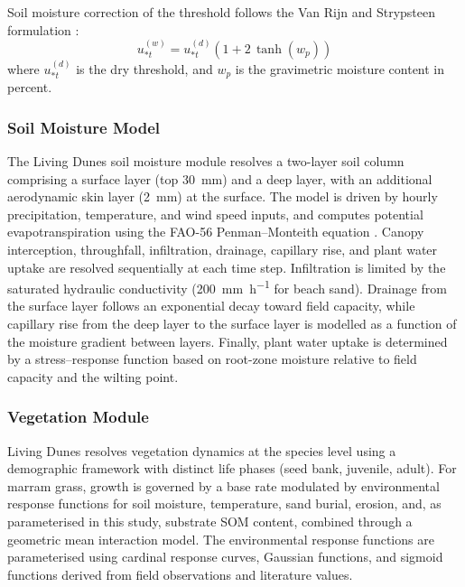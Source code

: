 \documentclass[authoryear,preprint,review,12pt]{elsarticle}
\newcommand{\ust}{u_{*t}}
\begin{document}
Soil moisture correction of the threshold follows the Van Rijn and Strypsteen formulation \citep{vanrijn2020}:
\begin{equation}
\ust^{(w)} = \ust^{(d)} \left(1 + 2\,\tanh\left(w_p\right)\right)
\label{eq:moisture_correction}
\end{equation}
where $\ust^{(d)}$ is the dry threshold, and $w_p$ is the gravimetric moisture content in percent.


\subsubsection{Soil Moisture Model}

The Living Dunes soil moisture module resolves a two-layer soil column comprising a surface layer (top \SI{30}{\milli\metre}) and a deep layer, with an additional aerodynamic skin layer (\SI{2}{\milli\metre}) at the surface. The model is driven by hourly precipitation, temperature, and wind speed inputs, and computes potential evapotranspiration using the FAO-56 Penman--Monteith equation \citep{allen1998crop}. Canopy interception, throughfall, infiltration, drainage, capillary rise, and plant water uptake are resolved sequentially at each time step. Infiltration is limited by the saturated hydraulic conductivity (\SI{200}{\milli\metre\per\hour} for beach sand). Drainage from the surface layer follows an exponential decay toward field capacity, while capillary rise from the deep layer to the surface layer is modelled as a function of the moisture gradient between layers. Finally, plant water uptake is determined by a stress--response function based on root-zone moisture relative to field capacity and the wilting point.

\subsubsection{Vegetation Module}

Living Dunes resolves vegetation dynamics at the species level using a demographic framework with distinct life phases (seed bank, juvenile, adult). For marram grass, growth is governed by a base rate modulated by environmental response functions for soil moisture, temperature, sand burial, erosion, and, as parameterised in this study, substrate SOM content, combined through a geometric mean interaction model. The environmental response functions are parameterised using cardinal response curves, Gaussian functions, and sigmoid functions derived from field observations and literature values.
\end{document}
